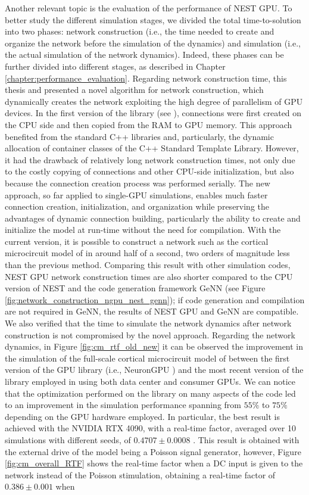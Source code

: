 \documentclass[a4paper, 12pt, twoside, openright]{book}
\begin{document}
Another relevant topic is the evaluation of the performance of NEST GPU. To better study the different simulation stages, we divided the total time-to-solution into two phases: network construction (i.e., the time needed to create and organize the network before the simulation of the dynamics) and simulation (i.e., the actual simulation of the network dynamics). Indeed, these phases can be further divided into different stages, as described in Chapter \ref{chapter:performance_evaluation}. Regarding network construction time, this thesis and \cite{Golosio2023} presented a novel algorithm for network construction, which dynamically creates the network exploiting the high degree of parallelism of GPU devices. In the first version of the library (see \cite{Golosio2021}), connections were first created on the CPU side and then copied from the RAM to GPU memory. This approach benefited from the standard C++ libraries and, particularly, the dynamic allocation of container classes of the C++ Standard Template Library. However, it had the drawback of relatively long network construction times, not only due to the costly copying of connections and other CPU-side initialization, but also because the connection creation process was performed serially. The new approach, so far applied to single-GPU simulations, enables much faster connection creation, initialization, and organization while preserving the advantages of dynamic connection building, particularly the ability to create and initialize the model at run-time without the need for compilation. With the current version, it is possible to construct a network such as the cortical microcircuit model of \cite{Potjans2012} in around half of a second, two orders of magnitude less than the previous method. Comparing this result with other simulation codes, NEST GPU network construction times are also shorter compared to the CPU version of NEST and the code generation framework GeNN (see Figure \ref{fig:network_construction_ngpu_nest_genn}); if code generation and compilation are not required in GeNN, the results of NEST GPU and GeNN are compatible. We also verified that the time to simulate the network dynamics after network construction is not compromised by the novel approach. Regarding the network dynamics, in Figure \ref{fig:cm_rtf_old_new} it can be observed the improvement in the simulation of the full-scale cortical microcircuit model of \cite{Potjans2012} between the first version of the GPU library (i.e., NeuronGPU \cite{Golosio2021}) and the most recent version of the library employed in \cite{Golosio2023} using both data center and consumer GPUs. We can notice that the optimization performed on the library on many aspects of the code led to an improvement in the simulation performance spanning from $55\%$ to $75\%$ depending on the GPU hardware employed. In particular, the best result is achieved with the NVIDIA RTX 4090, with a real-time factor, averaged over 10 simulations with different seeds, of $0.4707\pm 0.0008$ \cite{Golosio2023}. This result is obtained with the external drive of the model being a Poisson signal generator, however, Figure \ref{fig:cm_overall_RTF} shows the real-time factor when a DC input is given to the network instead of the Poisson stimulation, obtaining a real-time factor of $0.386\pm 0.001$ when 
\end{document}
